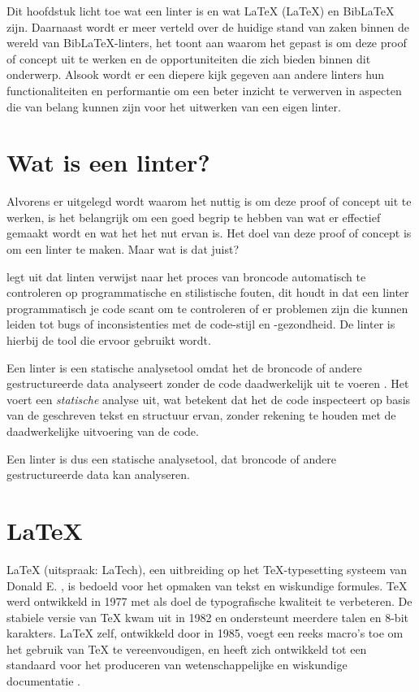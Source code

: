 Dit hoofdstuk licht toe wat een linter is en wat LaTeX (\LaTeX{}) en BibLaTeX zijn. Daarnaast wordt er meer verteld over de huidige stand van zaken binnen de wereld van BibLaTeX-linters, het toont aan waarom het gepast is om deze proof of concept uit te werken en de opportuniteiten die zich bieden binnen dit onderwerp. Alsook wordt er een diepere kijk gegeven aan andere linters hun functionaliteiten en performantie om een beter inzicht te verwerven in aspecten die van belang kunnen zijn voor het uitwerken van een eigen linter.

\section{Wat is een linter?}
Alvorens er uitgelegd wordt waarom het nuttig is om deze proof of concept uit te werken, is het belangrijk om een goed begrip te hebben van wat er effectief gemaakt wordt en wat het het nut ervan is. Het doel van deze proof of concept is om een linter te maken. Maar wat is dat juist?

\textcite{Kamunya2023} legt uit dat linten verwijst naar het proces van broncode automatisch te controleren op programmatische en stilistische fouten, dit houdt in dat een linter programmatisch je code scant om te controleren of er problemen zijn die kunnen leiden tot bugs of inconsistenties met de code-stijl en -gezondheid. De linter is hierbij de tool die ervoor gebruikt wordt.

Een linter is een statische analysetool omdat het de broncode of andere gestructureerde data analyseert zonder de code daadwerkelijk uit te voeren \autocite{Moeller2023}. Het voert een \emph{statische} analyse uit, wat betekent dat het de code inspecteert op basis van de geschreven tekst en structuur ervan, zonder rekening te houden met de daadwerkelijke uitvoering van de code.

Een linter is dus een statische analysetool, dat broncode of andere gestructureerde data kan analyseren.

\section{\LaTeX{}}
\LaTeX{} (uitspraak: LaTech), een uitbreiding op het \TeX{}-typesetting systeem van Donald E. \textcite{Knuth1984}, is bedoeld voor het opmaken van tekst en wiskundige formules. TeX werd ontwikkeld in 1977 met als doel de typografische kwaliteit te verbeteren. De stabiele versie van TeX kwam uit in 1982 en ondersteunt meerdere talen en 8-bit karakters. \LaTeX{} zelf, ontwikkeld door \textcite{Lamport1994} in 1985, voegt een reeks macro's toe om het gebruik van TeX te vereenvoudigen, en heeft zich ontwikkeld tot een standaard voor het produceren van wetenschappelijke en wiskundige documentatie \autocite{Oetiker2023}. 

